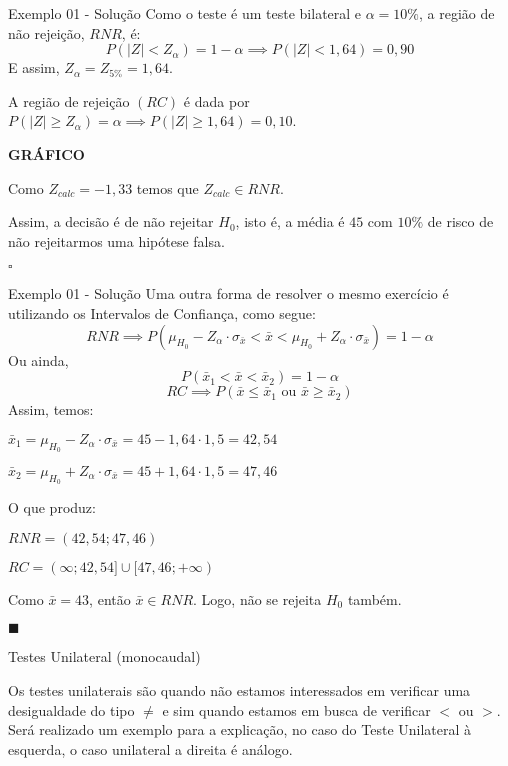 \documentclass[hyperref={pdfpagelabels=false}]{beamer}
\begin{document}
\begin{frame}{Exemplo 01 - Solução}
Como o teste é um teste bilateral e $\alpha = 10\%$, a região de não rejeição, $RNR$, é: \pause
$$P(|Z| < Z_{\alpha}) = 1 - \alpha \implies P(|Z| < 1,64) = 0,90$$  \pause
E assim, $Z_{\alpha} = Z_{5\%} = 1,64$.

A região de rejeição $(RC)$ é dada por $P(|Z| \geq Z_{\alpha}) = \alpha \implies P(|Z| \geq 1,64) = 0,10$. \pause

\textbf{GRÁFICO} \pause

Como $Z_{calc} = -1,33$ temos que $Z_{calc} \in RNR$. \pause

Assim, a decisão é de não rejeitar $H_0$, isto é, a média é $45$ com $10\%$ de risco de não rejeitarmos uma hipótese falsa.
\begin{flushright}
	$\square$
\end{flushright}
\end{frame}


\begin{frame}{Exemplo 01 - Solução}
	Uma outra forma de resolver o mesmo exercício é utilizando os Intervalos de Confiança, como segue: \pause
	$$RNR \implies P(\mu_{H_0} - Z_{\alpha} \cdot \sigma_{\bar{x}} < \bar{x} < \mu_{H_0} + Z_{\alpha} \cdot \sigma_{\bar{x}}) = 1 - \alpha$$ \pause
	Ou ainda, \pause
	$$P(\bar{x}_1 < \bar{x} < \bar{x}_2) = 1 - \alpha$$ \pause
	$$RC \implies P(\bar{x} \leq \bar{x}_1 \text{ ou } \bar{x} \geq \bar{x}_2)$$ \pause
	Assim, temos: \pause
	
	$\bar{x}_1 = \mu_{H_0} - Z_{\alpha} \cdot \sigma_{\bar{x}} = 45 - 1,64 \cdot 1,5 = 42,54$ \pause
	
	$\bar{x}_2 = \mu_{H_0} + Z_{\alpha} \cdot \sigma_{\bar{x}} = 45 + 1,64 \cdot 1,5 = 47,46$ \pause
	
	O que produz: \pause
	
	$RNR = (42,54; 47,46)$ \pause
	
	$RC = (\infty; 42,54]\cup[47,46;+\infty)$ \pause
	
	Como $\bar{x} = 43$, então $\bar{x} \in RNR$. \pause Logo, não se rejeita $H_0$ também.
	
	\begin{flushright}
		$\blacksquare$
	\end{flushright}
\end{frame}

\begin{frame}{Testes Unilateral (monocaudal)}
	
	Os testes unilaterais são quando não estamos interessados em verificar uma desigualdade do tipo $\neq$ e sim quando estamos em busca de verificar $<$ ou $>$. Será realizado um exemplo para a explicação, no caso do Teste Unilateral à esquerda, o caso unilateral a direita é análogo.
	
\end{frame}
\end{document}
